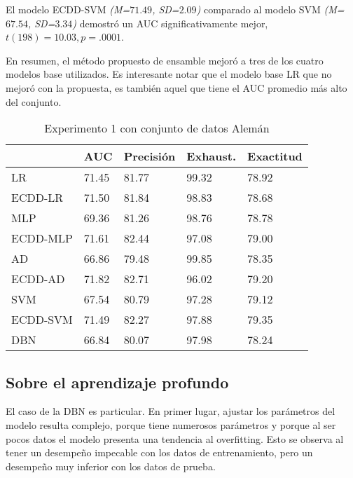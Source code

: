 El modelo ECDD-SVM \textit{(M=$71.49$, SD=$2.09$)} comparado al modelo \ac{SVM} \textit{(M=$67.54$, SD=$3.34$)} demostró un \ac{AUC} significativamente mejor, $t(198)=10.03, p=.0001$.

En resumen, el método propuesto de ensamble mejoró a tres de los cuatro modelos base utilizados. Es interesante notar que el modelo base \ac{LR} que no mejoró con la propuesta, es también aquel que tiene el \ac{AUC} promedio más alto del conjunto.


\begin{table}[htbp]
\centering
\caption{Experimento 1 con conjunto de datos Alemán}
\label{tab:german-proc1}
\begin{tabularx}{0.75\textwidth}{|l|Y Y Y Y|}
				\hline
				& AUC		& Precisión	& Exhaust.		& Exactitud	\\
				\hline
LR				& 71.45		& 81.77		& 99.32			& 78.92		\\		%
ECDD-LR			& 71.50		& 81.84		& 98.83			& 78.68		\\		%
				\hline
MLP				& 69.36		& 81.26		& 98.76			& 78.78		\\		%
ECDD-MLP		& 71.61		& 82.44		& 97.08			& 79.00		\\		%
				\hline
AD				& 66.86		& 79.48		& 99.85			& 78.35		\\		%
ECDD-AD			& 71.82		& 82.71		& 96.02			& 79.20		\\		%
				\hline
SVM				& 67.54		& 80.79		& 97.28			& 79.12		\\		%
ECDD-SVM		& 71.49		& 82.27		& 97.88			& 79.35		\\		%
				\hline
DBN				& 66.84		& 80.07		& 97.98			& 78.24		\\		%
				\hline
\end{tabularx}
\end{table}

\subsection{Sobre el aprendizaje profundo}

El caso de la \ac{DBN} es particular. En primer lugar, ajustar los parámetros del modelo resulta complejo, porque tiene numerosos parámetros y porque al ser pocos datos el modelo presenta una tendencia al overfitting. Esto se observa al tener un desempeño impecable con los datos de entrenamiento, pero un desempeño muy inferior con los datos de prueba.

